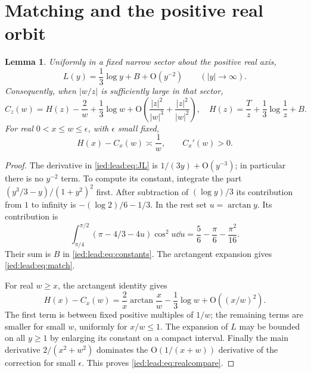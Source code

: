 \documentclass[11pt,letterpaper]{article}
\newtheorem{lemma}[theorem]{Lemma}
\theoremstyle{remark}\newtheorem{remark}[theorem]{Remark}
\newcommand{\Oh}{\mathrm O}\newcommand{\supp}{\operatorname{supp}}
\begin{document}
\section{Matching and the positive real orbit}\label{ied:lead:sec:matching}
\begin{lemma}\label{ied:lead:lem:matching}
Uniformly in a fixed narrow sector about the positive real axis,
\begin{equation}\label{ied:lead:eq:Lasym}
 L(y)=\frac13\log y+B+\Oh(y^{-2})\qquad(|y|\to\infty).
\end{equation}
Consequently, when $|w/z|$ is sufficiently large in that sector,
\begin{equation}\label{ied:lead:eq:match}
 C_z(w)=H(z)-\frac2w+\frac13\log w
  +\Oh\left(\frac{|z|^2}{|w|^3}+\frac{|z|^2}{|w|^2}\right),
 \quad H(z)=\frac Tz+\frac13\log\frac1z+B.
\end{equation}
For real $0<x\le w\le\epsilon$, with $\epsilon$ small fixed,
\begin{equation}\label{ied:lead:eq:realcompare}
 H(x)-C_x(w)\asymp\frac1w,\qquad C_x'(w)>0.
\end{equation}
\end{lemma}
\begin{proof}
The derivative in \eqref{ied:lead:eq:JL} is $1/(3y)+\Oh(y^{-3})$; in particular there is no $y^{-2}$ term. To compute its constant, integrate the part $(y^3/3-y)/(1+y^2)^2$ first. After subtraction of $(\log y)/3$ its contribution from $1$ to infinity is $-(\log2)/6-1/3$. In the rest set $u=\arctan y$. Its contribution is
\[
 \int_{\pi/4}^{\pi/2}(\pi-4/3-4u)\cos^2u\dd u
 =\frac56-\frac\pi6-\frac{\pi^2}{16}.
\]
Their sum is $B$ in \eqref{ied:lead:eq:constants}. The arctangent expansion gives \eqref{ied:lead:eq:match}.

For real $w\ge x$, the arctangent identity gives
\[
 H(x)-C_x(w)=\frac2x\arctan\frac xw-\frac13\log w
              +\Oh((x/w)^2).
\]
The first term is between fixed positive multiples of $1/w$; the remaining terms are smaller for small $w$, uniformly for $x/w\le1$. The expansion of $L$ may be bounded on all $y\ge1$ by enlarging its constant on a compact interval. Finally the main derivative $2/(x^2+w^2)$ dominates the $\Oh(1/(x+w))$ derivative of the correction for small $\epsilon$. This proves \eqref{ied:lead:eq:realcompare}.
\end{proof}
\end{document}
